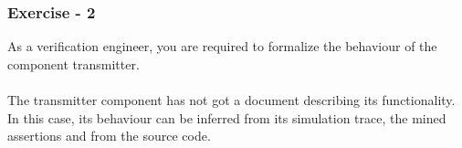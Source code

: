 \documentclass{beamer}
\begin{document}
\begin{frame}

\frametitle{Exercise - 2}

As a verification engineer, you are required to formalize the behaviour of the 
component transmitter.\\~\\
The transmitter component has not got a document describing its functionality. In
this case, its behaviour can be inferred from its simulation trace, the mined 
assertions and from the source code.

\end{frame}
\end{document}
